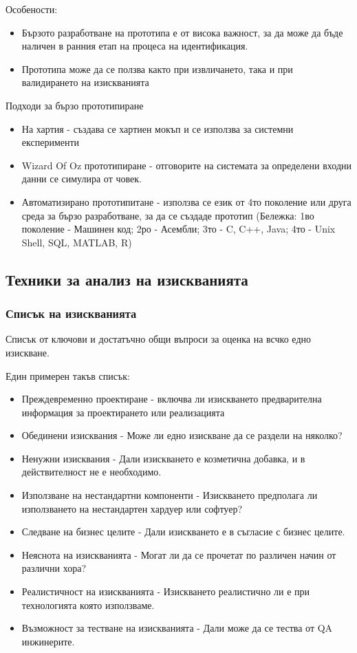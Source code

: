 \documentclass[fleqn,12pt]{article}
\begin{document}
 Особености:
\begin{itemize}
	\item Бързото разработване на прототипа е от висока важност, за да може да бъде наличен в ранния етап на процеса на идентификация.
	\item Прототипа може да се ползва както при извличането, така и при валидирането на изискванията
\end{itemize}


 Подходи за бързо прототипиране
\begin{itemize}
	\item На хартия - създава се хартиен мокъп и се използва за системни експерименти
	\item Wizard Of Oz прототипиране - отговорите на системата за определени входни данни се симулира от човек.
	\item Автоматизирано прототипитане - използва се език от 4то поколение или друга среда за бързо разработване, за да се създаде прототип
	(Бележка: 1во поколение - Машинен код; 2ро - Асембли; 3то - C, C++, Java; 4то - Unix Shell, SQL, MATLAB, R)
\end{itemize}


\subsection{Техники за анализ на изискванията}

\subsubsection{Списък на изискванията}
Списък от ключови и достатъчно общи въпроси за оценка на всчко едно изискване.

Един примерен такъв списък:
\begin{itemize}
	\item Преждевременно проектиране - включва ли изискването предварителна информация за проектирането или реализацията
	\item Обединени изисквания - Може ли едно изискване да се раздели на няколко?
	\item Ненужни изисквания - Дали изискването е козметична добавка, и в действителност не е необходимо.
	\item Използване на нестандартни компоненти - Изискването предполага ли използването на нестандартен хардуер или софтуер?
	\item Следване на бизнес целите - Дали изискването е в съгласие с бизнес целите.
	\item Неяснота на изискванията - Могат ли да се прочетат по различен начин от различни хора?
	\item Реалистичност на изискванията - Изискването реалистично ли е при технологията която използваме.
	\item Възможност за тестване на изискванията - Дали може да се тества от QA инжинерите.
\end{itemize}
\end{document}
